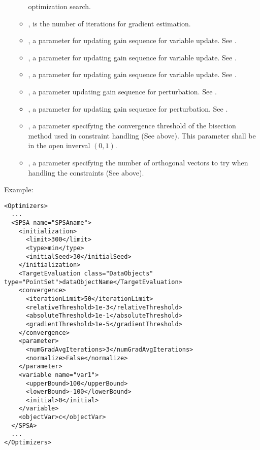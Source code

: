 \begin{itemize}
\begin{itemize}
    optimization search.
  \item {},  is the number of iterations for gradient estimation.
  \item {},  a parameter for updating gain sequence for variable update. See 
  \cite{spall1998implementation}.
  \item {},  a parameter for updating gain sequence for variable update. See 
  \cite{spall1998implementation}.
  \item {},  a parameter for updating gain sequence for variable update. See 
  \cite{spall1998implementation}.
  \item {},  a parameter updating gain sequence for perturbation. See 
  \cite{spall1998implementation}.
  \item {},  a parameter for updating gain sequence for perturbation. See 
  \cite{spall1998implementation}.
  \item {},  a parameter specifying the convergence threshold of the 
  bisection method used in constraint handling (See above). This parameter shall be in the open inverval $(0,1)$.
  \item {},  a parameter specifying the number of orthogonal vectors to try 
  when handling the constraints (See above).
  \end{itemize}
\end{itemize}


Example:
\begin{lstlisting}[style=XML]
<Optimizers>
  ...
  <SPSA name="SPSAname">
    <initialization>
      <limit>300</limit>
      <type>min</type>
      <initialSeed>30</initialSeed>
    </initialization>
    <TargetEvaluation class="DataObjects" type="PointSet">dataObjectName</TargetEvaluation>
    <convergence>
      <iterationLimit>50</iterationLimit>
      <relativeThreshold>1e-3</relativeThreshold>
      <absoluteThreshold>1e-1</absoluteThreshold>
      <gradientThreshold>1e-5</gradientThreshold>
    </convergence>
    <parameter>
      <numGradAvgIterations>3</numGradAvgIterations>
      <normalize>False</normalize>
    </parameter>
    <variable name="var1">
      <upperBound>100</upperBound>
      <lowerBound>-100</lowerBound>
      <initial>0</initial>
    </variable>
    <objectVar>c</objectVar>
  </SPSA>
  ...
</Optimizers>
\end{lstlisting}
